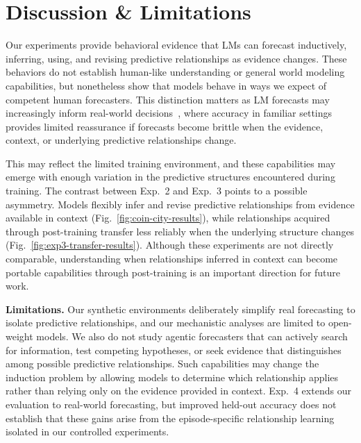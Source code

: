 \documentclass{article}
\begin{document}
\section{Discussion \& Limitations}
\label{sec:limitations}

Our experiments provide behavioral evidence that LMs can forecast inductively, inferring, using, and revising predictive relationships as evidence changes. These behaviors do not establish human-like understanding or general world modeling capabilities,  but nonetheless show that models behave in ways we expect of competent human forecasters. This distinction matters as LM forecasts may increasingly inform real-world decisions~\citep{schoenegger2025ai}, where accuracy in familiar settings provides limited reassurance if forecasts become brittle when the evidence, context, or underlying predictive relationships change.



This may reflect the limited training environment, and these capabilities may emerge with enough variation in the predictive structures encountered during training.
The contrast between Exp.~2 and Exp.~3 points to a possible asymmetry. Models flexibly infer and revise predictive relationships from evidence available in context (Fig.~\ref{fig:coin-city-results}), while relationships acquired through post-training transfer less reliably when the underlying structure changes (Fig.~\ref{fig:exp3-transfer-results}). Although these experiments are not directly comparable, understanding when relationships inferred in context can become portable capabilities through post-training is an important direction for future work.

\noindent\textbf{Limitations.}
Our synthetic environments deliberately simplify real forecasting to isolate predictive relationships, and our mechanistic analyses are limited to open-weight models.
We also do not study agentic forecasters that can actively search for information, test competing hypotheses, or seek evidence that distinguishes among possible predictive relationships. Such capabilities may change the induction problem by allowing models to determine which relationship applies rather than relying only on the evidence provided in context.
Exp.~4 extends our evaluation to real-world forecasting, but improved held-out accuracy does not establish that these gains arise from the episode-specific relationship learning isolated in our controlled experiments.
\end{document}
